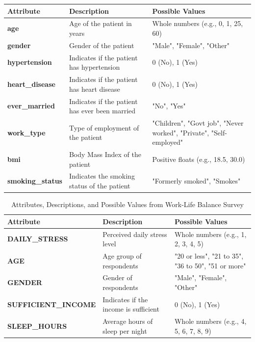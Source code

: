 \documentclass[runningheads]{llncs}
\begin{document}
\begin{enumerate}
\begin{table}[ht]
\begin{tabular}{|l|p{5cm}|p{4cm}|} 
\hline     
\textbf{Attribute} & \textbf{Description} & \textbf{Possible Values} \\        
\hline        
\textbf{age} & Age of the patient in years & Whole numbers (e.g., 0, 1, 25, 60) \\        
\hline        
\textbf{gender} & Gender of the patient & "Male", "Female", "Other" \\        
\hline        
\textbf{hypertension} & Indicates if the patient has hypertension & 0 (No), 1 (Yes) \\        
\hline        
\textbf{heart\_disease} & Indicates if the patient has heart disease & 0 (No), 1 (Yes) \\        
\hline        
\textbf{ever\_married} & Indicates if the patient has ever been married & "No", "Yes" \\        
\hline        
\textbf{work\_type} & Type of employment of the patient & "Children", "Govt job", "Never worked", "Private", "Self-employed" \\        
\hline        
\textbf{bmi} & Body Mass Index of the patient & Positive floats (e.g., 18.5, 30.0) \\        
\hline        
\textbf{smoking\_status} & Indicates the smoking status of the patient & "Formerly smoked", "Smokes" \\        
\hline    
\end{tabular}    
\end{table}

\begin{table}[ht]
    \centering
    \caption{Attributes, Descriptions, and Possible Values from Work-Life Balance Survey}
    \label{tab:work_life_balance_attributes}
    \begin{tabular}{|l|p{5cm}|p{4cm}|} 
        \hline
        \textbf{Attribute} & \textbf{Description} & \textbf{Possible Values} \\ 
        \hline
        \textbf{DAILY\_STRESS}      & Perceived daily stress level & Whole numbers (e.g., 1, 2, 3, 4, 5) \\ 
        \hline
        \textbf{AGE}                 & Age group of respondents & "20 or less", "21 to 35", "36 to 50", "51 or more" \\ 
        \hline
        \textbf{GENDER}              & Gender of respondents & "Male", "Female", "Other" \\ 
        \hline
        \textbf{SUFFICIENT\_INCOME}  & Indicates if the income is sufficient & 0 (No), 1 (Yes) \\ 
        \hline
        \textbf{SLEEP\_HOURS}        & Average hours of sleep per night & Whole numbers (e.g., 4, 5, 6, 7, 8, 9) \\ 
        \hline
    \end{tabular}
\end{table}




\end{enumerate}
\end{document}

